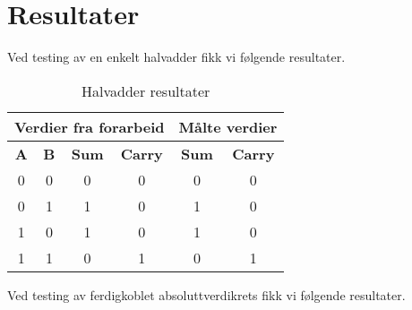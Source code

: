 \section{Resultater}
Ved testing av en enkelt halvadder fikk vi følgende resultater.

\begin{table}[!htb]
    \centering
    \caption{Halvadder resultater}
    \label{tab:inl_sparse_tabell}
    \begin{tabular}{|c|c|c|c|c|c|}
        \hline
        \multicolumn{4}{|c|}{\textbf{Verdier fra forarbeid}} & \multicolumn{2}{c|}{\textbf{Målte verdier}} \\ \hline
        \textbf{A}    & \textbf{B} & \textbf{Sum}  & \textbf{Carry}  & \textbf{Sum}  & \textbf{Carry}\\ \hline
        0             & 0 & 0 & 0 &  0  & 0 \\ \hline
        0             & 1 & 1 & 0 &  1  & 0 \\ \hline
        1             & 0 & 1 & 0 &  1  & 0 \\ \hline
        1             & 1 & 0 & 1 &  0  & 1 \\ \hline
    \end{tabular}
\end{table}

Ved testing av ferdigkoblet absoluttverdikrets fikk vi følgende resultater.

